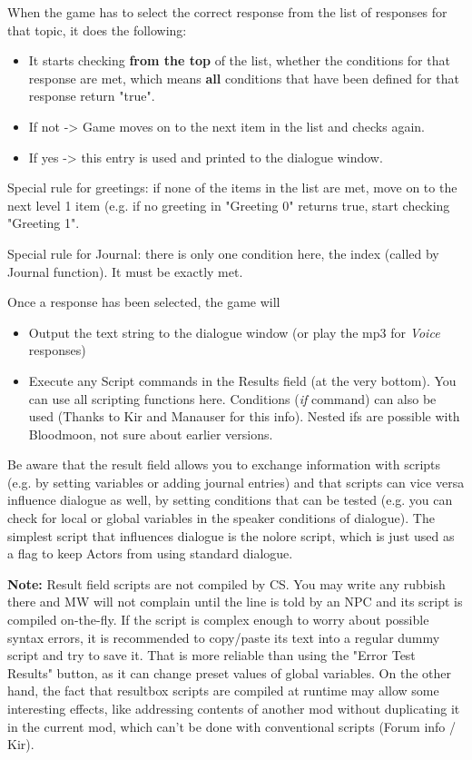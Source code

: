 When the game has to select the correct response from the list of
responses for that topic, it does the following:

\begin{itemize}
\item
  It starts checking \textbf{from the top} of the list, whether the
  conditions for that response are met, which means \textbf{all}
  conditions that have been defined for that response return "true".
\item
  If not -\textgreater{} Game moves on to the next item in the list and
  checks again.
\item
  If yes -\textgreater{} this entry is used and printed to the dialogue
  window.
\end{itemize}

Special rule for greetings: if none of the items in the list are met,
move on to the next level 1 item (e.g. if no greeting in "Greeting 0"
returns true, start checking "Greeting 1".

Special rule for Journal: there is only one condition here, the index
(called by Journal function). It must be exactly met.

Once a response has been selected, the game will

\begin{itemize}
\item
  Output the text string to the dialogue window (or play the mp3 for
  \emph{Voice} responses)
\item
  Execute any Script commands in the Results field (at the very bottom).
  You can use all scripting functions here. Conditions (\emph{if}
  command) can also be used (Thanks to Kir and Manauser for this info).
  Nested ifs are possible with Bloodmoon, not sure about earlier
  versions.
\end{itemize}

Be aware that the result field allows you to exchange information with
scripts (e.g. by setting variables or adding journal entries) and that
scripts can vice versa influence dialogue as well, by setting conditions
that can be tested (e.g. you can check for local or global variables in
the speaker conditions of dialogue). The simplest script that influences
dialogue is the nolore script, which is just used as a flag to keep
Actors from using standard dialogue.

\textbf{Note:} Result field scripts are not compiled by CS. You may
write any rubbish there and MW will not complain until the line is told
by an NPC and its script is compiled on-the-fly. If the script is
complex enough to worry about possible syntax errors, it is recommended
to copy/paste its text into a regular dummy script and try to save it.
That is more reliable than using the "Error Test Results" button, as it
can change preset values of global variables. On the other hand, the
fact that resultbox scripts are compiled at runtime may allow some
interesting effects, like addressing contents of another mod without
duplicating it in the current mod, which can't be done with conventional
scripts (Forum info / Kir).

